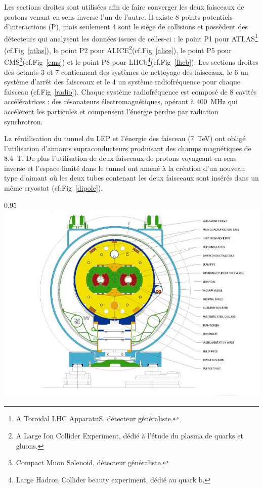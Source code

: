 Les sections droites sont utilisées afin de faire converger les deux faisceaux de protons venant en sens inverse l'un de l'autre. Il existe \num{8} points potentiels d'interactions (P), mais seulement \num{4} sont le siège de collisions et possèdent des détecteurs qui analysent les données issues de celles-ci : le point P1 pour ATLAS\footnote{A Toroidal LHC ApparatuS, détecteur généraliste.} (cf.Fig~\ref{atlas}), le point P2 pour ALICE\footnote{A Large Ion Collider Experiment, dédié à l'étude du plasma de quarks et gluons.}(cf.Fig~\ref{alice}), le point P5 pour CMS\footnote{Compact Muon Solenoid, détecteur généraliste.}(cf.Fig~\ref{cms}) et le point P8 pour LHCb\footnote{Large Hadron Collider beauty experiment, dédié au quark b.}(cf.Fig~\ref{lhcb}). Les sections droites des octants \num{3} et \num{7} contiennent des systèmes de nettoyage des faisceaux, le \num{6} un système d'arrêt des faisceaux et le \num{4} un système radiofréquence pour chaque faisceau (cf.Fig~\ref{radio}). Chaque système radiofréquence est composé de \num{8} cavités accélératrices : des résonateurs électromagnétiques, opérant à \SI{400}{\mega\hertz} qui accélèrent les particules et compensent l'énergie perdue par radiation synchrotron.

La réutilisation du tunnel du LEP et l'énergie des faisceau (\SI{7}{\tera\eV}) ont obligé l'utilisation d'aimants supraconducteurs produisant des champs magnétiques de \SI{8.4}{\tesla}. De plus l'utilisation de deux faisceaux de protons voyageant en sens inverse et l'espace limité dans le tunnel ont amené à la création d'un nouveau type d'aimant où les deux tubes contenant les deux faisceaux sont insérés dans un même cryostat (cf.Fig~\ref{dipole}).

\begin{minipagewithmarginpars}[ht!]{0.95\textwidth}
\centering
\includegraphics[width=1.0\textwidth]{LHC/dipole.jpg}
\label{dipole}	
\end{minipagewithmarginpars}

